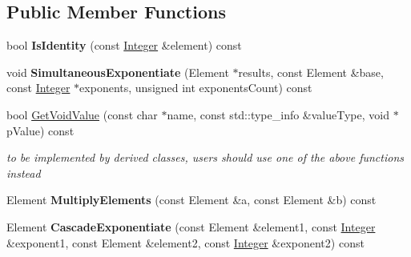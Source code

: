 \subsection*{Public Member Functions}
\begin{DoxyCompactItemize}
\item 
\hypertarget{class_d_l___group_parameters___g_f_p_a6bb3dbd327a516a47aa2407cbce10d55}{
bool {\bfseries IsIdentity} (const \hyperlink{class_integer}{Integer} \&element) const }
\label{class_d_l___group_parameters___g_f_p_a6bb3dbd327a516a47aa2407cbce10d55}

\item 
\hypertarget{class_d_l___group_parameters___g_f_p_a4c0256412b51e8587ec66f95253391d6}{
void {\bfseries SimultaneousExponentiate} (Element $\ast$results, const Element \&base, const \hyperlink{class_integer}{Integer} $\ast$exponents, unsigned int exponentsCount) const }
\label{class_d_l___group_parameters___g_f_p_a4c0256412b51e8587ec66f95253391d6}

\item 
\hypertarget{class_d_l___group_parameters___g_f_p_a02a6a339e6fb0458ef4cea824dfa965d}{
bool \hyperlink{class_d_l___group_parameters___g_f_p_a02a6a339e6fb0458ef4cea824dfa965d}{GetVoidValue} (const char $\ast$name, const std::type\_\-info \&valueType, void $\ast$pValue) const }
\label{class_d_l___group_parameters___g_f_p_a02a6a339e6fb0458ef4cea824dfa965d}

\begin{DoxyCompactList}\small\item\em to be implemented by derived classes, users should use one of the above functions instead \item\end{DoxyCompactList}\item 
\hypertarget{class_d_l___group_parameters___g_f_p_aee931073a72a93966143d0de37e7ef25}{
Element {\bfseries MultiplyElements} (const Element \&a, const Element \&b) const }
\label{class_d_l___group_parameters___g_f_p_aee931073a72a93966143d0de37e7ef25}

\item 
\hypertarget{class_d_l___group_parameters___g_f_p_af686643cd173658e1c75294c0c31495c}{
Element {\bfseries CascadeExponentiate} (const Element \&element1, const \hyperlink{class_integer}{Integer} \&exponent1, const Element \&element2, const \hyperlink{class_integer}{Integer} \&exponent2) const }
\label{class_d_l___group_parameters___g_f_p_af686643cd173658e1c75294c0c31495c}

\end{DoxyCompactItemize}
